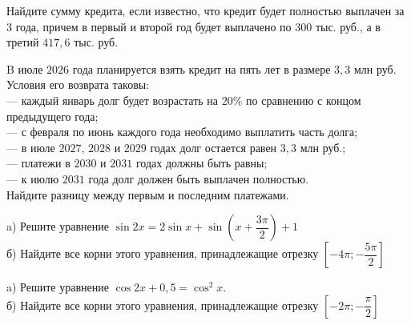 \begin{consultation}
\begin{listofex}
		Найдите сумму кредита, если известно, что кредит будет полностью выплачен за 3 года, причем в первый и второй год будет выплачено по \( 300 \) тыс. руб., а в третий \( 417,6 \) тыс. руб.
		\item B июле \( 2026 \) года планируется взять кредит на пять лет в размере \( 3,3 \) млн руб. Условия его возврата таковы:\\
		— каждый январь долг будет возрастать на \( 20\% \) по сравнению с концом предыдущего года;\\
		— с февраля по июнь каждого года необходимо выплатить часть долга;\\
		— в июле \( 2027 \), \( 2028 \) и \( 2029 \) годах долг остается равен \( 3,3 \) млн руб.;\\
		— платежи в \( 2030 \) и \( 2031 \) годах должны быть равны;\\
		— к июлю \( 2031 \) года долг должен быть выплачен полностью.\\
		Найдите разницу между первым и последним платежами.
		\item a) Решите уравнение \( \sin2x=2\sin x + \sin \left( x+\dfrac{ 3\pi }{ 2 } \right)+1\) \\
		б) Найдите все корни этого уравнения, принадлежащие отрезку \( \left[ - 4\pi; -\dfrac{5\pi}{2} \right]  \)
		\item a) Решите уравнение \( \cos2x+0,5=\cos^2x \). \\
		б) Найдите все корни этого уравнения, принадлежащие отрезку \( \left[ -2\pi;-\dfrac{\pi}{2} \right]  \)
	\end{listofex}
\end{consultation}

